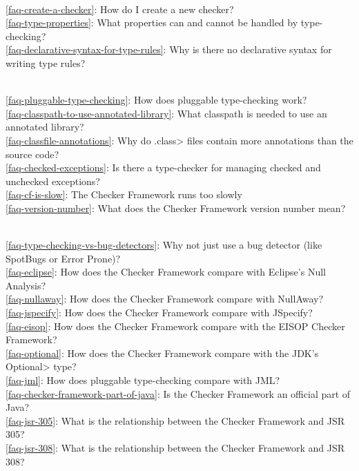 \\ \ref{faq-create-a-checker}: How do I create a new checker?
\\ \ref{faq-type-properties}: What properties can and cannot be handled by type-checking?
\\ \ref{faq-declarative-syntax-for-type-rules}: Why is there no declarative syntax for writing type rules?

\\ \ref{faq-pluggable-type-checking}: How does pluggable type-checking work?
\\ \ref{faq-classpath-to-use-annotated-library}: What classpath is needed to use an annotated library?
\\ \ref{faq-classfile-annotations}: Why do \<.class> files contain more annotations than the source code?
\\ \ref{faq-checked-exceptions}: Is there a type-checker for managing checked and unchecked exceptions?
\\ \ref{faq-cf-is-slow}: The Checker Framework runs too slowly
\\ \ref{faq-version-number}: What does the Checker Framework version number mean?

\\ \ref{faq-type-checking-vs-bug-detectors}: Why not just use a bug detector (like SpotBugs or Error Prone)?
\\ \ref{faq-eclipse}: How does the Checker Framework compare with Eclipse's Null Analysis?
\\ \ref{faq-nullaway}: How does the Checker Framework compare with NullAway?
\\ \ref{faq-jspecify}: How does the Checker Framework compare with JSpecify?
\\ \ref{faq-eisop}: How does the Checker Framework compare with the EISOP Checker Framework?
\\ \ref{faq-optional}: How does the Checker Framework compare with the JDK's \<Optional> type?
\\ \ref{faq-jml}: How does pluggable type-checking compare with JML?
\\ \ref{faq-checker-framework-part-of-java}: Is the Checker Framework an official part of Java?
\\ \ref{faq-jsr-305}: What is the relationship between the Checker Framework and JSR 305?
\\ \ref{faq-jsr-308}: What is the relationship between the Checker Framework and JSR 308?


